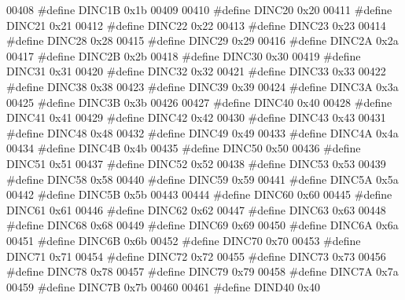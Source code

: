 \begin{DoxyCode}
00408 \textcolor{preprocessor}{#define DINC1B 0x1b}
00409 
00410 \textcolor{preprocessor}{#define DINC20 0x20}
00411 \textcolor{preprocessor}{#define DINC21 0x21}
00412 \textcolor{preprocessor}{#define DINC22 0x22}
00413 \textcolor{preprocessor}{#define DINC23 0x23}
00414 \textcolor{preprocessor}{#define DINC28 0x28}
00415 \textcolor{preprocessor}{#define DINC29 0x29}
00416 \textcolor{preprocessor}{#define DINC2A 0x2a}
00417 \textcolor{preprocessor}{#define DINC2B 0x2b}
00418 \textcolor{preprocessor}{#define DINC30 0x30}
00419 \textcolor{preprocessor}{#define DINC31 0x31}
00420 \textcolor{preprocessor}{#define DINC32 0x32}
00421 \textcolor{preprocessor}{#define DINC33 0x33}
00422 \textcolor{preprocessor}{#define DINC38 0x38}
00423 \textcolor{preprocessor}{#define DINC39 0x39}
00424 \textcolor{preprocessor}{#define DINC3A 0x3a}
00425 \textcolor{preprocessor}{#define DINC3B 0x3b}
00426 
00427 \textcolor{preprocessor}{#define DINC40 0x40}
00428 \textcolor{preprocessor}{#define DINC41 0x41}
00429 \textcolor{preprocessor}{#define DINC42 0x42}
00430 \textcolor{preprocessor}{#define DINC43 0x43}
00431 \textcolor{preprocessor}{#define DINC48 0x48}
00432 \textcolor{preprocessor}{#define DINC49 0x49}
00433 \textcolor{preprocessor}{#define DINC4A 0x4a}
00434 \textcolor{preprocessor}{#define DINC4B 0x4b}
00435 \textcolor{preprocessor}{#define DINC50 0x50}
00436 \textcolor{preprocessor}{#define DINC51 0x51}
00437 \textcolor{preprocessor}{#define DINC52 0x52}
00438 \textcolor{preprocessor}{#define DINC53 0x53}
00439 \textcolor{preprocessor}{#define DINC58 0x58}
00440 \textcolor{preprocessor}{#define DINC59 0x59}
00441 \textcolor{preprocessor}{#define DINC5A 0x5a}
00442 \textcolor{preprocessor}{#define DINC5B 0x5b}
00443 
00444 \textcolor{preprocessor}{#define DINC60 0x60}
00445 \textcolor{preprocessor}{#define DINC61 0x61}
00446 \textcolor{preprocessor}{#define DINC62 0x62}
00447 \textcolor{preprocessor}{#define DINC63 0x63}
00448 \textcolor{preprocessor}{#define DINC68 0x68}
00449 \textcolor{preprocessor}{#define DINC69 0x69}
00450 \textcolor{preprocessor}{#define DINC6A 0x6a}
00451 \textcolor{preprocessor}{#define DINC6B 0x6b}
00452 \textcolor{preprocessor}{#define DINC70 0x70}
00453 \textcolor{preprocessor}{#define DINC71 0x71}
00454 \textcolor{preprocessor}{#define DINC72 0x72}
00455 \textcolor{preprocessor}{#define DINC73 0x73}
00456 \textcolor{preprocessor}{#define DINC78 0x78}
00457 \textcolor{preprocessor}{#define DINC79 0x79}
00458 \textcolor{preprocessor}{#define DINC7A 0x7a}
00459 \textcolor{preprocessor}{#define DINC7B 0x7b}
00460 
00461 \textcolor{preprocessor}{#define DIND40 0x40}

\end{DoxyCode}
